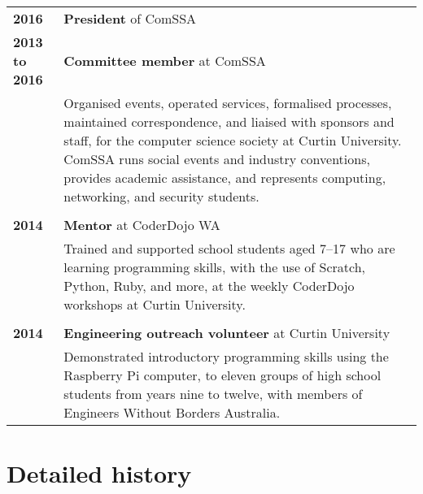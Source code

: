 \documentclass[a4paper,12pt]{article}
\begin{document}
\begin{tabular}{p{35mm}p{125mm}}
	                    \textbf{2016}               & \textbf{President} of ComSSA
	\vspace{0.2em}  \\  \textbf{2013 to 2016}       & \textbf{Committee member} at ComSSA
	\vspace{0.2em}  \\                              & Organised events, operated services, formalised processes, maintained correspondence, and liaised with sponsors and staff, for the computer science society at Curtin University. ComSSA runs social events and industry conventions, provides academic assistance, and represents computing, networking, and security students.
	\\              \\  \textbf{2014}               & \textbf{Mentor} at CoderDojo WA
	\vspace{0.2em}  \\                              & Trained and supported school students aged 7--17 who are learning programming skills, with the use of Scratch, Python, Ruby, and more, at the weekly CoderDojo workshops at Curtin University.
	\\              \\  \textbf{2014}               & \textbf{Engineering outreach volunteer} at Curtin University
	\vspace{0.2em}  \\                              & Demonstrated introductory programming skills using the Raspberry Pi computer, to eleven groups of high school students from years nine to twelve, with members of Engineers Without Borders Australia.
\end{tabular}

\section*{Detailed history}
\end{document}
